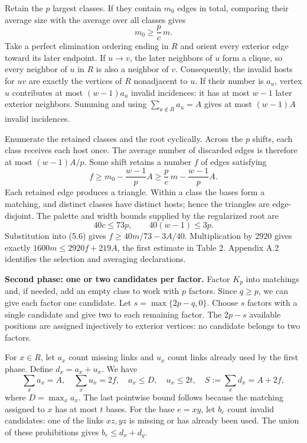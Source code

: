 \documentclass[english,11pt,a4paper]{article}
\begin{document}
Retain the \(p\) largest classes. If they contain \(m_0\) edges in total, comparing their average size with the average over all classes gives \[
m_0\ge\frac pc\,m.
\tag{5.5}
\] Take a perfect elimination ordering ending in \(R\) and orient every exterior edge toward its later endpoint. If \(u\to v\), the later neighbors of \(u\) form a clique, so every neighbor of \(u\) in \(R\) is also a neighbor of \(v\). Consequently, the invalid hosts for \(uv\) are exactly the vertices of \(R\) nonadjacent to \(u\). If their number is \(a_u\), vertex \(u\) contributes at most \((w-1)a_u\) invalid incidences: it has at most \(w-1\) later exterior neighbors. Summing and using \(\sum_{u\notin R}a_u=A\) gives at most \((w-1)A\) invalid incidences.

Enumerate the retained classes and the root cyclically. Across the \(p\) shifts, each class receives each host once. The average number of discarded edges is therefore at most \((w-1)A/p\). Some shift retains a number \(f\) of edges satisfying \[
f\ge m_0-\frac{w-1}{p}A
\ge\frac pc\,m-\frac{w-1}{p}A.
\tag{5.6}
\] Each retained edge produces a triangle. Within a class the bases form a matching, and distinct classes have distinct hosts; hence the triangles are edge-disjoint. The palette and width bounds supplied by the regularized root are \[
40c\le73p,\qquad 40(w-1)\le3p.
\tag{5.7}
\] Substitution into (5.6) gives \(f\ge40m/73-3A/40\). Multiplication by \(2920\) gives exactly \(1600m\le2920f+219A\), the first estimate in Table 2. Appendix A.2 identifies the selection and averaging declarations.

\textbf{Second phase: one or two candidates per factor.} Factor \(K_p\) into matchings and, if needed, add an empty class to work with \(p\) factors. Since \(q\ge p\), we can give each factor one candidate. Let \(s=\max\{2p-q,0\}\). Choose \(s\) factors with a single candidate and give two to each remaining factor. The \(2p-s\) available positions are assigned injectively to exterior vertices: no candidate belongs to two factors.

For \(x\in R\), let \(a_x\) count missing links and \(u_x\) count links already used by the first phase. Define \(d_x=a_x+u_x\). We have \[
\sum_xa_x=A,\quad \sum_xu_x=2f,\quad
a_x\le D,\quad u_x\le2t,\quad
S:=\sum_xd_x=A+2f,
\tag{5.8}
\] where \(D=\max_xa_x\). The last pointwise bound follows because the matching assigned to \(x\) has at most \(t\) bases. For the base \(e=xy\), let \(b_e\) count invalid candidates: one of the links \(xz,yz\) is missing or has already been used. The union of these prohibitions gives \(b_e\le d_x+d_y\).
\end{document}
